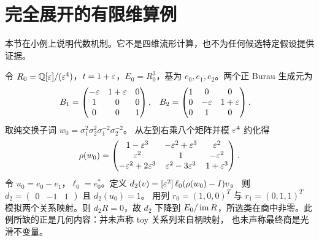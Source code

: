 \section{完全展开的有限维算例}\label{sec:toy-example}

本节在小例上说明代数机制。它不是四维流形计算，也不为任何候选特定假设提供证据。

令 $R_0=\mathbb{Q}[\varepsilon]/(\varepsilon^4)$，$t=1+\varepsilon$，$E_0=R_0^3$，基为 $e_0,e_1,e_2$。两个正 Burau
生成元为
\begin{align}
B_1&=
\begin{pmatrix}
-\varepsilon&1+\varepsilon&0\\
1&0&0\\
0&0&1
\end{pmatrix},
&
B_2&=
\begin{pmatrix}
1&0&0\\
0&-\varepsilon&1+\varepsilon\\
0&1&0
\end{pmatrix}.
\end{align}
取纯交换子词
$w_0=\sigma_1^2\sigma_2^2\sigma_1^{-2}\sigma_2^{-2}$。
从左到右乘八个矩阵并模 $\varepsilon^4$ 约化得
\[
\rho(w_0)=
\begin{pmatrix}
1-\varepsilon^3&-\varepsilon^2+\varepsilon^3&\varepsilon^2\\
\varepsilon^2&1&-\varepsilon^2\\
-\varepsilon^2+2\varepsilon^3&\varepsilon^2-3\varepsilon^3&1+\varepsilon^3
\end{pmatrix}.
\]
令 $u_0=e_0-e_1$，$\ell_0=e_0^*$。定义
$d_2(v)=[\varepsilon^2]\,\ell_0(\rho(w_0)-I)v$。
则 $d_2=\begin{pmatrix}0&-1&1\end{pmatrix}$ 且 $d_2(u_0)=1$。
用列 $r_0=(1,0,0)^T$ 与 $r_1=(0,1,1)^T$ 模拟两个关系映射。则 $d_2R=0$，故 $d_2$ 下降到
$E_0/\operatorname{im} R$，所选类在商中非零。此例所缺的正是几何内容：并未声称 toy 关系列来自柄映射，
也未声称最终商是光滑不变量。
